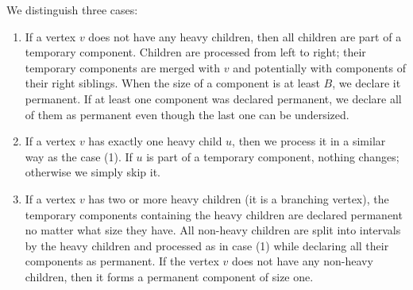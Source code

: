 We distinguish three cases:
\begin{enumerate}
	\item If a vertex $v$ does not have any heavy children, then all children are part of a temporary component.
	Children are processed from left to right; their temporary components are merged with $v$ and potentially with components of their right siblings.
	When the size of a component is at least $B$, we declare it permanent.
	If at least one component was declared permanent, we declare all of them as permanent even though the last one can be undersized.
	\item If a vertex $v$ has exactly one heavy child $u$, then we process it in a similar way as the case (1).
	If $u$ is part of a temporary component, nothing changes; otherwise we simply skip it.
	\item If a vertex $v$ has two or more heavy children (it is a branching vertex), the temporary components containing the heavy children are declared permanent no matter what size they have.
	All non-heavy children are split into intervals by the heavy children and processed as in case (1) while declaring all their components as permanent.
	If the vertex $v$ does not have any non-heavy children, then it forms a permanent component of size one.
\end{enumerate}

